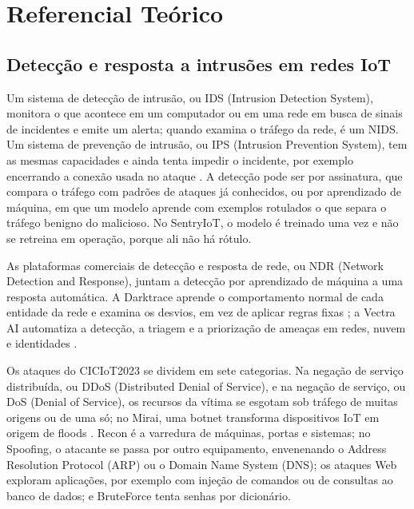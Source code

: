 \section{Referencial Teórico}
\label{sec:referencial}

\subsection{Detecção e resposta a intrusões em redes IoT}
\label{sec:ids}

Um sistema de detecção de intrusão, ou IDS (Intrusion Detection System), monitora o que acontece em um computador ou em uma rede em busca de sinais de incidentes e emite um alerta; quando examina o tráfego da rede, é um NIDS. Um sistema de prevenção de intrusão, ou IPS (Intrusion Prevention System), tem as mesmas capacidades e ainda tenta impedir o incidente, por exemplo encerrando a conexão usada no ataque \cite{scarfone2007}. A detecção pode ser por assinatura, que compara o tráfego com padrões de ataques já conhecidos, ou por aprendizado de máquina, em que um modelo aprende com exemplos rotulados o que separa o tráfego benigno do malicioso. No SentryIoT, o modelo é treinado uma vez e não se retreina em operação, porque ali não há rótulo.

As plataformas comerciais de detecção e resposta de rede, ou NDR (Network Detection and Response), juntam a detecção por aprendizado de máquina a uma resposta automática. A Darktrace aprende o comportamento normal de cada entidade da rede e examina os desvios, em vez de aplicar regras fixas \cite{darktrace2024}; a Vectra AI automatiza a detecção, a triagem e a priorização de ameaças em redes, nuvem e identidades \cite{vectra2022}.

Os ataques do CICIoT2023 se dividem em sete categorias. Na negação de serviço distribuída, ou DDoS (Distributed Denial of Service), e na negação de serviço, ou DoS (Denial of Service), os recursos da vítima se esgotam sob tráfego de muitas origens ou de uma só; no Mirai, uma botnet transforma dispositivos IoT em origem de floods \cite{antonakakis2017}. Recon é a varredura de máquinas, portas e sistemas; no Spoofing, o atacante se passa por outro equipamento, envenenando o Address Resolution Protocol (ARP) ou o Domain Name System (DNS); os ataques Web exploram aplicações, por exemplo com injeção de comandos ou de consultas ao banco de dados; e BruteForce tenta senhas por dicionário.


